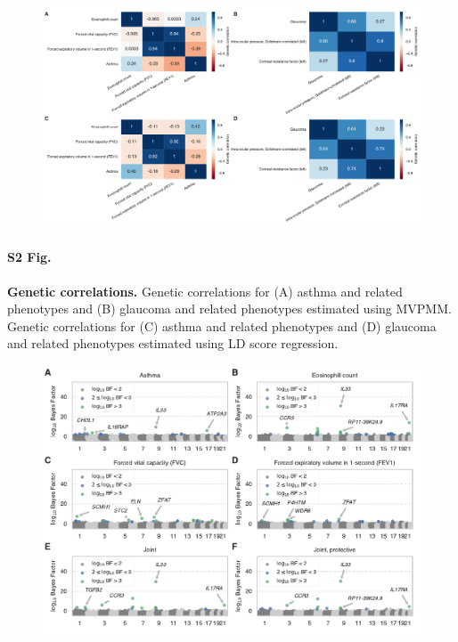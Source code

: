 \begin{figure}[H]
\includegraphics[width=\textwidth]{../figures/final/Figure_S02.pdf}
\end{figure}
\paragraph*{S2 Fig.}
\label{gcorr_fig}
{\bf Genetic correlations.} Genetic correlations for (A) asthma and related phenotypes and (B) glaucoma and related phenotypes estimated using MVPMM. Genetic correlations for (C) asthma and related phenotypes and (D) glaucoma and related phenotypes estimated using LD score regression.

\begin{figure}[H]
\includegraphics[width=\textwidth]{../figures/final/Figure_S03.pdf}
\end{figure}
